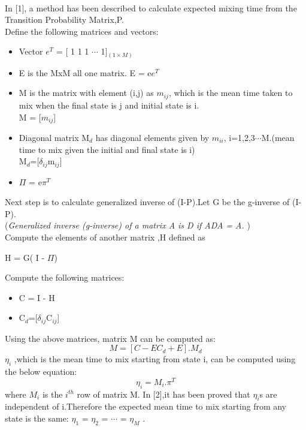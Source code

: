 \documentclass[12pt]{article}
\begin{document}
\begin{itemize}
\paragraph{}
In [1], a method has been described to calculate expected mixing time from the Transition Probability Matrix,P.\\ Define the following matrices and vectors:
\begin{itemize}
\item Vector $e^{T}$ =  [ 1 1 1 $\cdots$ 1]$_{(1 \times M)}$
\item E is the MxM all one matrix. E = e$e^{T}$ 
\item M is the matrix with element (i,j) as $m_{ij}$, which is the mean time taken to mix when the final state is j and initial state is i. \\
M = [$m_{ij}$]
\item Diagonal matrix M$_{d}$ has diagonal elements given by $m_{ii}$, i=1,2,3$\cdots$M.(mean time to mix given the initial and final state is i)\\
M$_{d}$=[$\delta_{ij}$m$_{ij}$]
\item $\Pi$ = e$\pi^{T}$
\end{itemize}
Next step is to calculate generalized inverse of (I-P).Let G be the g-inverse of (I-P).\\
(\textit{Generalized inverse (g-inverse) of a matrix A is D if ADA = A.} )\\
Compute the elements of another matrix ,H defined as 
\begin{center}
H = G( I - $\Pi$)
\end{center}
Compute the following matrices:
\begin{itemize}
\item C = I - H 
\item C$_{d}$=[$\delta_{ij}$C$_{ij}$]
\end{itemize}
Using the above matrices, matrix M can be computed as:
\begin{equation}
M = [ C - EC_{d} + E ].M_{d}
\end{equation}
$\eta_{i}$ ,which is the mean time to mix starting from state i, can be computed using the below equation:
\begin{equation}
\eta_{i} = M_{i}.\pi^{T} 
\end{equation}
where $M_{i}$ is the $i^{th}$ row of matrix M.
In [2],it has been proved that $\eta_{i}$s are independent of i.Therefore the expected mean time to mix starting from any state is the same: $\eta_{1}$ = $\eta_{2}$ = $\cdots$ = $\eta_{M}$ .\\

\end{itemize}
\end{document}
